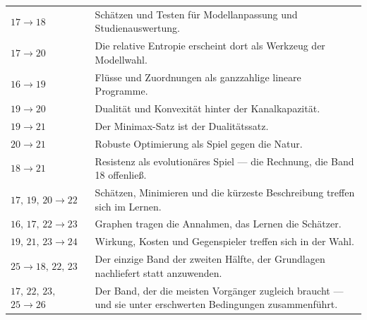 \begin{merksatz}
\begin{center}
{\small
\renewcommand{\arraystretch}{1.5}
\begin{tabular}{@{}P{2.0cm}P{6.4cm}@{}}
\toprule
$17 \to 18$ & Schätzen und Testen für Modellanpassung und Studienauswertung.\\
$17 \to 20$ & Die relative Entropie erscheint dort als Werkzeug der Modellwahl.\\
$16 \to 19$ & Flüsse und Zuordnungen als ganzzahlige lineare Programme.\\
$19 \to 20$ & Dualität und Konvexität hinter der Kanalkapazität.\\
$19 \to 21$ & Der Minimax-Satz ist der Dualitätssatz.\\
$20 \to 21$ & Robuste Optimierung als Spiel gegen die Natur.\\
$18 \to 21$ & Resistenz als evolutionäres Spiel --- die Rechnung, die Band 18 offenließ.\\
$17,\,19,\,20 \to 22$ & Schätzen, Minimieren und die kürzeste Beschreibung treffen sich im Lernen.\\
$16,\,17,\,22 \to 23$ & Graphen tragen die Annahmen, das Lernen die Schätzer.\\
$19,\,21,\,23 \to 24$ & Wirkung, Kosten und Gegenspieler treffen sich in der Wahl.\\
$25 \to 18,\,22,\,23$ & Der einzige Band der zweiten Hälfte, der Grundlagen nachliefert statt anzuwenden.\\
$17,\,22,\,23,$ $25 \to 26$ & Der Band, der die meisten Vorgänger zugleich braucht --- und sie unter erschwerten Bedingungen zusammenführt.\\
\bottomrule
\end{tabular}}
\end{center}

\begin{center}
\begin{minipage}{0.88\textwidth}
\end{minipage}
\end{center}
\end{merksatz}

